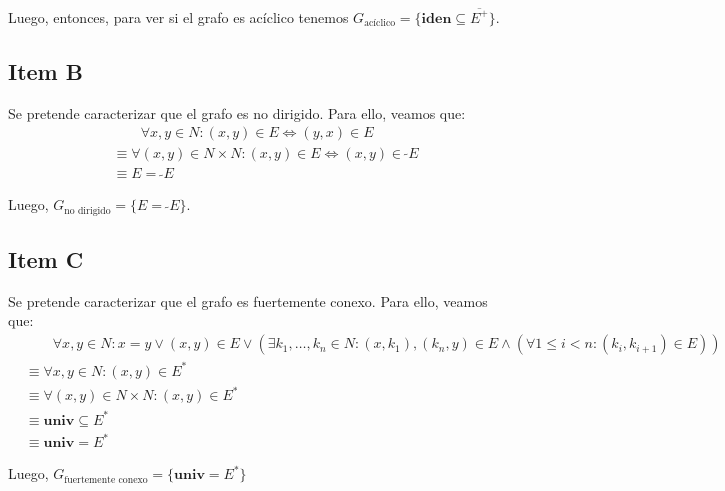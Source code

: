 \documentclass{article}
\newcommand{\iden}{\textbf{iden}}
\newcommand{\univ}{\textbf{univ}}
\newcommand{\conv}[1]{\ \tilde{}#1}
\begin{document}
Luego, entonces, para ver si el grafo es acíclico tenemos $G_\text{acíclico} = \{\iden \subseteq \overline{E^+}\}$.

\subsection*{Item B}
Se pretende caracterizar que el grafo es no dirigido.
Para ello, veamos que:
\begin{equation*}
  \begin{aligned}
    &\qquad \forall x, y \in N : (x, y) \in E \iff (y, x) \in E \\ 
    &\equiv \forall (x, y) \in N \times N : (x, y) \in E \iff (x, y) \in \conv{E} \\ 
    &\equiv E = \conv{E}
  \end{aligned}
\end{equation*}

Luego, $G_\text{no dirigido} = \{E = \conv{E}\}$.

\subsection*{Item C}
Se pretende caracterizar que el grafo es fuertemente conexo.
Para ello, veamos que:
\begin{equation*}
  \begin{aligned}
    &\qquad \forall x, y \in N : x = y \lor (x, y) \in E \lor (\exists k_1, \dots, k_n \in N : (x, k_1), (k_n, y) \in E \land (\forall 1 \leq i < n : (k_i, k_{i+1}) \in E)) \\ 
    &\equiv \forall x, y \in N : (x, y) \in E^* \\ 
    &\equiv \forall (x, y) \in N \times N : (x, y) \in E^* \\ 
    &\equiv \univ \subseteq E^* \\ 
    &\equiv \univ = E^*
  \end{aligned}
\end{equation*}

Luego, $G_\text{fuertemente conexo} = \{\univ = E^*\}$
\end{document}
